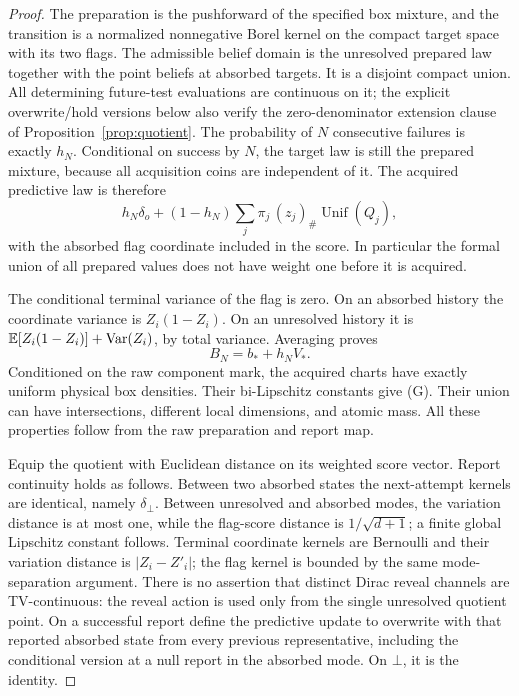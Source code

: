 \begin{proof}
The preparation is the pushforward of the specified box mixture, and the transition is a normalized nonnegative Borel kernel on the compact target space with its two flags. The admissible belief domain is the unresolved prepared law together with the point beliefs at absorbed targets. It is a disjoint compact union. All determining future-test evaluations are continuous on it; the explicit overwrite/hold versions below also verify the zero-denominator extension clause of Proposition~\ref{prop:quotient}. The probability of $N$ consecutive failures is exactly $h_N$. Conditional on success by $N$, the target law is still the prepared mixture, because all acquisition coins are independent of it. The acquired predictive law is therefore
\begin{equation}\label{eq:sensor-acquired}
 h_N\delta_o+(1-h_N)\sum_j\pi_j\,(z_j)_\#\operatorname{Unif}(Q_j),
\end{equation}
with the absorbed flag coordinate included in the score. In particular the formal union of all prepared values does not have weight one before it is acquired.

The conditional terminal variance of the flag is zero. On an absorbed history the coordinate variance is $Z_i(1-Z_i)$. On an unresolved history it is
$\mathbb E[Z_i(1-Z_i)]+\operatorname{Var}(Z_i)$, by total variance. Averaging proves
\begin{equation}\label{eq:sensor-B}
 B_N=b_*+h_NV_*.
\end{equation}
Conditioned on the raw component mark, the acquired charts have exactly uniform physical box densities. Their bi-Lipschitz constants give \textup{(G)}. Their union can have intersections, different local dimensions, and atomic mass. All these properties follow from the raw preparation and report map.

Equip the quotient with Euclidean distance on its weighted score vector. Report continuity holds as follows. Between two absorbed states the next-attempt kernels are identical, namely $\delta_\bot$. Between unresolved and absorbed modes, the variation distance is at most one, while the flag-score distance is $1/\sqrt{d+1}$; a finite global Lipschitz constant follows. Terminal coordinate kernels are Bernoulli and their variation distance is $|Z_i-Z'_i|$; the flag kernel is bounded by the same mode-separation argument. There is no assertion that distinct Dirac reveal channels are TV-continuous: the reveal action is used only from the single unresolved quotient point. On a successful report define the predictive update to overwrite with that reported absorbed state from every previous representative, including the conditional version at a null report in the absorbed mode. On $\bot$, it is the identity.


\end{proof}
